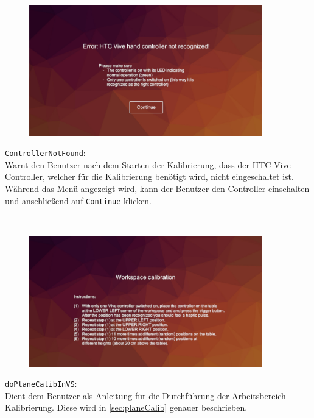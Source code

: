 \begin{minipage}{0.6\textwidth}
	\begin{figure}[H] 
		\includegraphics[trim=3cm 1cm 3cm 3cm, clip, width=0.9\textwidth]{Bilder/ControllerNotFound.jpg}
			\label{fig:ControllerNotFound}
	\end{figure}
\end{minipage}
\begin{minipage}{0.4\textwidth}
	\texttt{ControllerNotFound}:\\
	Warnt den Benutzer nach dem Starten der Kalibrierung, dass der HTC Vive Controller, welcher für die Kalibrierung benötigt wird, nicht eingeschaltet ist. Während das Menü angezeigt wird, kann der Benutzer den Controller einschalten und anschließend auf \texttt{Continue} klicken.
\end{minipage}\\

\begin{minipage}{0.6\textwidth}
	\begin{figure}[H] 
		\includegraphics[trim=3cm 1cm 3cm 3cm, clip, width=0.9\textwidth]{Bilder/doPlaneCalibInVS.jpg}
			\label{fig:doPlaneCalibInVS}
	\end{figure}
\end{minipage}
\begin{minipage}{0.4\textwidth}
	\texttt{doPlaneCalibInVS}:\\
	Dient dem Benutzer als Anleitung für die Durchführung der Arbeitsbereich-Kalibrierung. Diese wird in \ref{sec:planeCalib} genauer beschrieben.
\end{minipage}\\

